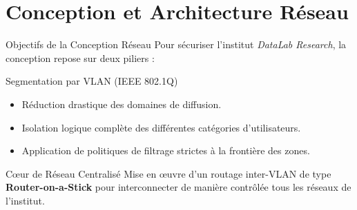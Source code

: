 \section{Conception et Architecture Réseau}

\begin{frame}{Objectifs de la Conception Réseau}
    Pour sécuriser l'institut \textit{DataLab Research}, la conception repose sur deux piliers :
    
    \vspace{0.3cm}
    \begin{block}{Segmentation par VLAN (IEEE 802.1Q)}
        \begin{itemize}
            \item Réduction drastique des domaines de diffusion.
            \item Isolation logique complète des différentes catégories d'utilisateurs.
            \item Application de politiques de filtrage strictes à la frontière des zones.
        \end{itemize}
    \end{block}

    \begin{block}{Cœur de Réseau Centralisé}
        Mise en œuvre d'un routage inter-VLAN de type \textbf{Router-on-a-Stick} pour interconnecter de manière contrôlée tous les réseaux de l'institut.
    \end{block}
\end{frame}

